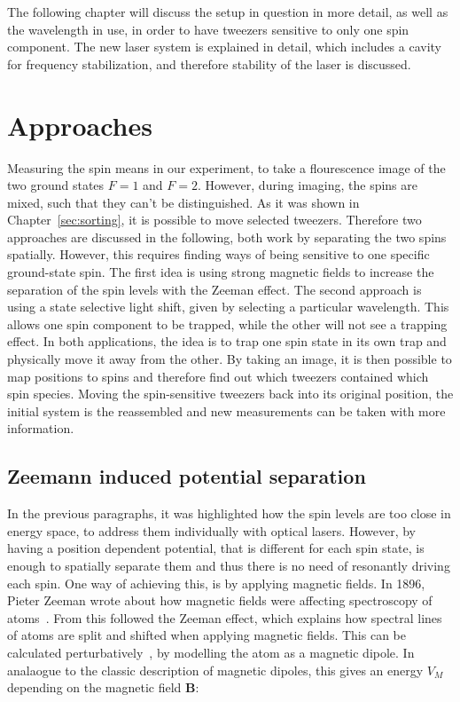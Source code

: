 The following chapter will discuss the setup in question in more detail, as well as the wavelength in use, in order to have tweezers sensitive to only one spin component. The new laser system is explained in detail, which includes a cavity for frequency stabilization, and therefore stability of the laser is discussed.

\section{Approaches}

Measuring the spin means in our experiment, to take a flourescence image of the two ground states $F=1$ and $F=2$. However, during imaging, the spins are mixed, such that they can't be distinguished. As it was shown in Chapter~\ref{sec:sorting}, it is possible to move selected tweezers. Therefore two approaches are discussed in the following, both work by separating the two spins spatially. However, this requires finding ways of being sensitive to one specific ground-state spin. The first idea is using strong magnetic fields to increase the separation of the spin levels with the Zeeman effect. The second approach is using a state selective light shift, given by selecting a particular wavelength. This allows one spin component to be trapped, while the other will not see a trapping effect. In both applications, the idea is to trap one spin state in its own trap and physically move it away from the other. By taking an image, it is then possible to map positions to spins and therefore find out which tweezers contained which spin species. Moving the spin-sensitive tweezers back into its original position, the initial system is the reassembled and new measurements can be taken with more information.

\subsection{Zeemann induced potential separation}

In the previous paragraphs, it was highlighted how the spin levels are too close in energy space, to address them individually with optical lasers. However, by having a position dependent potential, that is different for each spin state, is enough to spatially separate them and thus there is no need of resonantly driving each spin. One way of achieving this, is by applying magnetic fields. In 1896, Pieter Zeeman wrote about how magnetic fields were affecting spectroscopy of atoms~\cite{Zeeman1896}. From this followed the Zeeman effect, which explains how spectral lines of atoms are split and shifted when applying magnetic fields. This can be calculated perturbatively~\cite{Griffiths2004}, by modelling the atom as a magnetic dipole. In analaogue to the classic description of magnetic dipoles, this gives an energy $V_M$ depending on the magnetic field $\bm{B}$:

